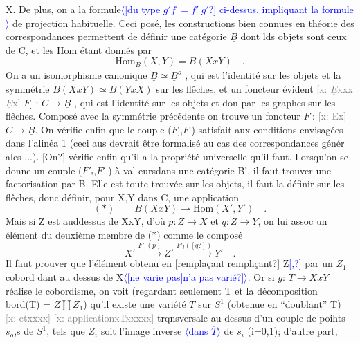 \documentclass[11pt]{article}
\newcommand{\hand}[1]{\textcolor{blue}{#1}}
\newcommand{\inserted}[2][]{\textcolor{blue}{$\langle$#2$\rangle$}}
\newcommand{\xout}[1]{\textcolor{gray}{[\textsf{x:} #1]}}
\newcommand{\unsure}[1]{[#1?]}
\begin{document}
X. De plus, on a la formule\inserted{\unsure{du type $g'f_{.} = f'_{.}g'$} ci-dessus, impliquant la formule} de projection habituelle. Ceci posé, les
constructions bien connues en théorie des correspondances permettent
de définir une catégorie $\underline{B}$ dont lds objets sont ceux de C, et les
Hom étant donnés par
\[ \mathrm{Hom}_{\underline{B}}(X,Y) = B(XxY) \quad . \]
On a un isomorphisme canonique $\underline{B} \simeq \underline{B}^{o}$ , qui est l'identité sur les
objets et la symmétrie $B(XxY)\simeq B(YxX)$ sur les flêches, et un foncteur
évident \xout{$\underline{E}$xxx$\underline{E}$x} $F_{.}$ : $C \to \underline{B}$ , qui est l'identité sur les objets et don
par les graphes sur les flêches. Composé avec la symmétrie précédente
on trouve un foncteur $F^{\cdot}$: \xout{Ex} $C \to \underline{B}$. On vérifie enfin que le couple
($F_{.}$,$F^{\cdot}$) satisfait aux conditions envisagées dans l'alinéa 1 (ceci aus
devrait être formalisé au cas des correspondances génér ales ...). \unsure{On}
vérifie enfin qu'il a la propriété universelle qu'il faut. Lorsqu'on
se donne un couple ($F'_{!}$,$F'^{\cdot}$) à val eursdans une catégorie B', il faut
trouver une factorisation par B. Elle est toute trouvée sur les
objets, il faut la définir sur les flêches, donc définir, pour X,Y
dans C, une application
\[ (*) \qquad B(XxY) \to \mathrm{Hom}(X',Y') \quad . \]
Mais si Z est auddessus de XxY, d'où $p:Z \to X$ et $q:Z \to Y$, on lui assoc
un élément du deuxième membre de (*) comme le composé
\[ X' \xrightarrow{F'^{\cdot}(p)} Z' \xrightarrow{F'_{!}(\unsure{q})} Y' \quad . \]
Il faut prouver que l'élément obtenu en \unsure{remplaçant|remphçant} Z\hand{\unsure{,}} par un $Z_1$ cobord
dant au dessus de X\inserted{\unsure{ne varie pas|n'a pas varié}}. Or si $g$: $T \to XxY$ réalise le cobordisme, on
voit (regardant seulement T et la décomposition bord(T) = $Z \amalg Z_1$)
qu'il existe une variété $\overline{T}$ sur $S^1$ (obtenue en ``doublant'' T) \xout{etxxxx}
\xout{applicationxTxxxxx} trqnsversale au dessus d'un couple de poihts $s_o$,s
de $S^1$, tels que $Z_i$ soit l'image inverse \inserted{dans $\overline{T}$} de $s_i$ (i=0,1); d'autre part,
\end{document}
